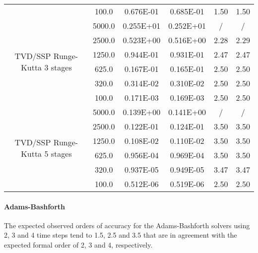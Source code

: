 \documentclass[pdftex,preprint,3p,times,numbers]{elsarticle}
\begin{document}
\begin{table}[!ht]
{\begin{tabular}{cccccc}
                 &    100.0        &  0.676E-01    &  0.685E-01    & 1.50          & 1.50          \\
    \cmidrule{2-6}
    \multirow{6}{*}{TVD/SSP Runge-Kutta 3 stages}
                 &   5000.0        &  0.255E+01    &  0.252E+01    & /             & /             \\
                 &   2500.0        &  0.523E+00    &  0.516E+00    & 2.28          & 2.29          \\
                 &   1250.0        &  0.944E-01    &  0.931E-01    & 2.47          & 2.47          \\
                 &    625.0        &  0.167E-01    &  0.165E-01    & 2.50          & 2.50          \\
                 &    320.0        &  0.314E-02    &  0.310E-02    & 2.50          & 2.50          \\
                 &    100.0        &  0.171E-03    &  0.169E-03    & 2.50          & 2.50          \\
    \cmidrule{2-6}
    \multirow{6}{*}{TVD/SSP Runge-Kutta 5 stages}
                 &   5000.0        &  0.139E+00    &  0.141E+00    & /             & /             \\
                 &   2500.0        &  0.122E-01    &  0.124E-01    & 3.50          & 3.50          \\
                 &   1250.0        &  0.108E-02    &  0.110E-02    & 3.50          & 3.50          \\
                 &    625.0        &  0.956E-04    &  0.969E-04    & 3.50          & 3.50          \\
                 &    320.0        &  0.937E-05    &  0.949E-05    & 3.47          & 3.47          \\
                 &    100.0        &  0.512E-06    &  0.519E-06    & 2.50          & 2.50          \\
    \bottomrule
  \end{tabular}}
\end{table}

\paragraph{Adams-Bashforth}

The expected observed orders of accuracy for the Adams-Bashforth solvers using 2, 3 and 4 time steps tend to 1.5, 2.5 and 3.5 that are in agreement with the expected formal order of 2, 3 and 4, respectively.
\end{document}
